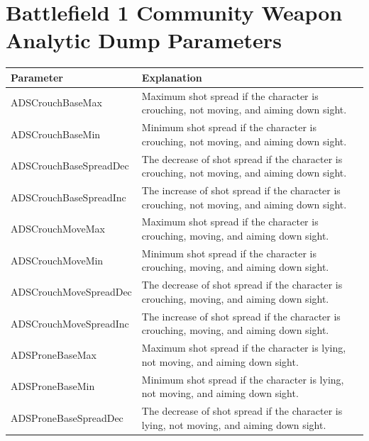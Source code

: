 \documentclass[MGS,Master,english]{twbook}%
\begin{document}
\chapter{Battlefield 1 Community Weapon Analytic Dump Parameters} \label{bf1::dumpParams}
\begin{longtable}[c]{|l|p{10.5cm}|}
	\hline
	\textbf{Parameter}     & \textbf{Explanation}                                                                                                           \\ \hline
	\endhead
	ADSCrouchBaseMax       & Maximum shot spread if the character is crouching, not moving, and aiming down sight.                                          \\ \hline
	ADSCrouchBaseMin       & Minimum shot spread if the character is crouching, not moving, and aiming down sight.                                          \\ \hline
	ADSCrouchBaseSpreadDec & The decrease of shot spread if the character is crouching, not moving, and aiming down sight.                                  \\ \hline
	ADSCrouchBaseSpreadInc & The increase of shot spread if the character is crouching, not moving, and aiming down sight.                                  \\ \hline
	ADSCrouchMoveMax       & Maximum shot spread if the character is crouching, moving, and aiming down sight.                                              \\ \hline
	ADSCrouchMoveMin       & Minimum shot spread if the character is crouching, moving, and aiming down sight.                                              \\ \hline
	ADSCrouchMoveSpreadDec & The decrease of shot spread if the character is crouching, moving, and aiming down sight.                                      \\ \hline
	ADSCrouchMoveSpreadInc & The increase of shot spread if the character is crouching, moving, and aiming down sight.                                      \\ \hline
	ADSProneBaseMax        & Maximum shot spread if the character is lying, not moving, and aiming down sight.                                              \\ \hline
	ADSProneBaseMin        & Minimum shot spread if the character is lying, not moving, and aiming down sight.                                              \\ \hline
	ADSProneBaseSpreadDec  & The decrease of shot spread if the character is lying, not moving, and aiming down sight.                                      \\ \hline

\end{longtable}
\end{document}
